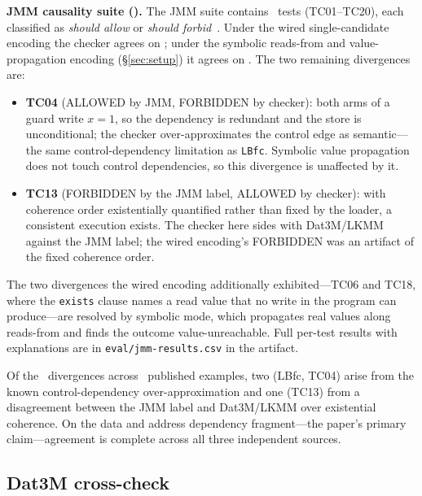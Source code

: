 \documentclass{llncs}
\begin{document}
\noindent\textbf{JMM causality suite (\JmmExamplesAgreement).} The JMM suite contains
\JmmTotal~tests (TC01--TC20), each classified as \textit{should allow} or
\textit{should forbid}~\cite{manson2005java}. Under the wired
single-candidate encoding the checker agrees on \JmmAgreementWired; under the
symbolic reads-from and value-propagation encoding (\S\ref{sec:setup}) it
agrees on \JmmAgreement. The two remaining divergences are:
\begin{itemize}
\item \textbf{TC04} (ALLOWED by JMM, FORBIDDEN by checker): both arms
of a guard write $x{=}1$, so the dependency is redundant and the store
is unconditional; the checker over-approximates the control edge as
semantic---the same control-dependency limitation as \texttt{LBfc}.
Symbolic value propagation does not touch control dependencies, so this
divergence is unaffected by it.
\item \textbf{TC13} (FORBIDDEN by the JMM label, ALLOWED by checker):
with coherence order existentially quantified rather than fixed by the
loader, a consistent execution exists. The checker here sides with
Dat3M/LKMM against the JMM label; the wired encoding's FORBIDDEN was an
artifact of the fixed coherence order.
\end{itemize}
The two divergences the wired encoding additionally exhibited---TC06 and
TC18, where the \texttt{exists} clause names a read value that no write in
the program can produce---are resolved by symbolic mode, which propagates
real values along reads-from and finds the outcome value-unreachable.
Full per-test results with explanations are in \texttt{eval/jmm-results.csv}
in the artifact.

\noindent Of the \PublishedExampleDivergences~divergences across
\PublishedExampleTotal~published examples, two (LBfc, TC04) arise from the
known control-dependency over-approximation and one (TC13) from a
disagreement between the JMM label and Dat3M/LKMM over existential
coherence. On the data and address dependency fragment---the paper's
primary claim---agreement is complete across all three independent sources.

\subsection{Dat3M cross-check}
\label{sec:dat3m}
\end{document}

